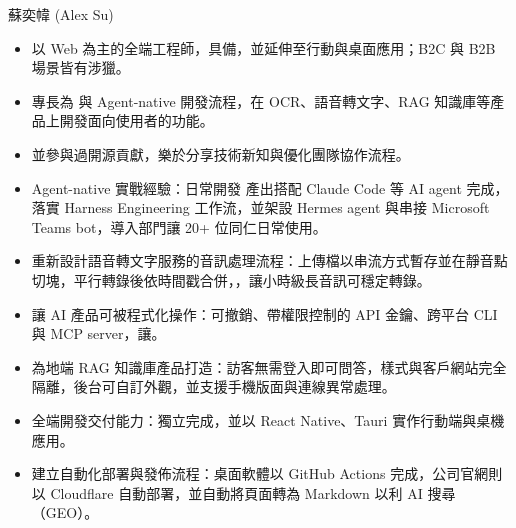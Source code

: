 \documentclass[a4paper]{article}
\begin{document}
\fontsize{10}{13}\selectfont

\begin{minipage}[t]{280pt}
  \vspace{0pt}
  {\fontsize{22}{22}\selectfont 蘇奕幃 (Alex Su)}\par
  \vspace{15.5pt}
  {\fontsize{11}{15}\selectfont
   }
\end{minipage}%
\begin{minipage}[t]{258pt}
  \vspace{0pt}
  {\fontsize{11}{18.5}\selectfont
   }
\end{minipage}

\vspace{1.5pt}


\begin{itemize}
  \item 以 Web 為主的全端工程師，具備，並延伸至行動與桌面應用；B2C 與 B2B 場景皆有涉獵。
  \item 專長為 與 Agent-native 開發流程，在 OCR、語音轉文字、RAG 知識庫等產品上開發面向使用者的功能。
  \item {}並參與過開源貢獻，樂於分享技術新知與優化團隊協作流程。
\end{itemize}


\begin{itemize}
  \item Agent-native 實戰經驗：日常開發  產出搭配 Claude Code 等 AI agent 完成，落實 Harness Engineering 工作流，並架設 Hermes agent 與串接 Microsoft Teams bot，導入部門讓 20+ 位同仁日常使用。
  \item 重新設計語音轉文字服務的音訊處理流程：上傳檔以串流方式暫存並在靜音點切塊，平行轉錄後依時間戳合併，，讓小時級長音訊可穩定轉錄。
  \item 讓 AI 產品可被程式化操作：可撤銷、帶權限控制的 API 金鑰、跨平台 CLI 與 MCP server，讓。
  \item 為地端 RAG 知識庫產品打造：訪客無需登入即可問答，樣式與客戶網站完全隔離，後台可自訂外觀，並支援手機版面與連線異常處理。
  \item 全端開發交付能力：獨立完成，並以 React Native、Tauri 實作行動端與桌機應用。
  \item 建立自動化部署與發佈流程：桌面軟體以 GitHub Actions 完成，公司官網則以 Cloudflare 自動部署，並自動將頁面轉為 Markdown 以利 AI 搜尋（GEO）。
\end{itemize}
\end{document}
